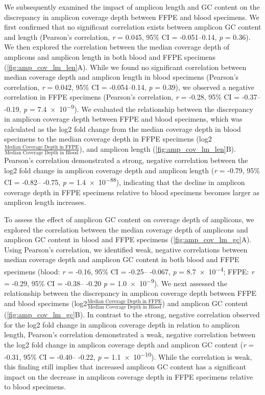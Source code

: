 We subsequently examined the impact of amplicon length and GC content on the discrepancy in amplicon coverage depth between FFPE and blood specimens. We first confirmed that no significant correlation exists between amplicon GC content and length (Pearson's correlation, \textit{r} = 0.045, 95\% CI = -0.051--0.14, \textit{p} = 0.36). We then explored the correlation between the median coverage depth of amplicons and amplicon length in both blood and FFPE specimens (\autoref{fig:amp_cov_lm_len}A). While we found no significant correlation between median coverage depth and amplicon length in blood specimens (Pearson's correlation, \textit{r} = 0.042, 95\% CI = -0.054--0.14, \textit{p} = 0.39), we observed a negative correlation in FFPE specimens (Pearson's correlation, \textit{r} = -0.28, 95\% CI = -0.37-- -0.19, \textit{p} = \num{7.4e-9}). We evaluated the relationship between the discrepancy in amplicon coverage depth between FFPE and blood specimens, which was calculated as the log2 fold change from the median coverage depth in blood specimens to the median coverage depth in FFPE specimens (log2\( \frac{\text{Median Coverage Depth in FFPE}}{\text{Median Coverage Depth in Blood}} \)), and amplicon length (\autoref{fig:amp_cov_lm_len}B). Pearson's correlation demonstrated a strong, negative correlation between the log2 fold change in amplicon coverage depth and amplicon length (\textit{r} = \mbox{-0.79}, 95\% CI = -0.82-- -0.75, \textit{p} = \num{1.4e-88}), indicating that the decline in amplicon coverage depth in FFPE specimens relative to blood specimens becomes larger as amplicon length increases.

To assess the effect of amplicon GC content on coverage depth of amplicons, we explored the correlation between the median coverage depth of amplicons and amplicon GC content in blood and FFPE specimens (\autoref{fig:amp_cov_lm_gc}A). Using Pearson's correlation, we identified weak, negative correlations between median coverage depth and amplicon GC content in both blood and FFPE specimens (blood: \textit{r} = -0.16, 95\% CI = -0.25-- -0.067, \textit{p} = \num{8.7e-4}; FFPE: \textit{r} = -0.29, 95\% CI = -0.38-- -0.20 \textit{p} = \num{1.0e-9}). We next assessed the relationship between the discrepancy in amplicon coverage depth between FFPE and blood specimens (log2\( \frac{\text{Median Coverage Depth in FFPE}}{\text{Median Coverage Depth in Blood}} \)) and amplicon GC content (\autoref{fig:amp_cov_lm_gc}B). In contrast to the strong, negative correlation observed for the log2 fold change in amplicon coverage depth in relation to amplicon length, Pearson's correlation demonstrated a weak, negative correlation between the log2 fold change in amplicon coverage depth and amplicon GC content (\textit{r} = -0.31, 95\% CI = -0.40-- -0.22, \textit{p} = \num{1.1e-10}). While the correlation is weak, this finding still implies that increased amplicon GC content has a significant impact on the decrease in amplicon coverage depth in FFPE specimens relative to blood specimens.

